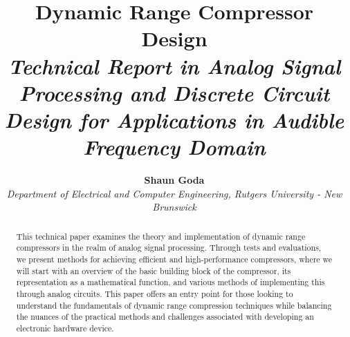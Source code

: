 \documentclass[10pt]{article}
\begin{document}
    \pagestyle{fancy}
    \fancyhf{}
    \renewcommand{\headrulewidth}{0pt}
    \fancypagestyle{firstpage}{
        \fancyhf{}
        \fancyfoot[C]{\footnotesize Page \thepage\ of \pageref{LastPage}}
        \renewcommand{\headrulewidth}{0pt}
    }

    \title{
        \vspace{-5ex}
        \textbf{\huge Dynamic Range Compressor Design}\\
        \textit{Technical Report in Analog Signal Processing and Discrete Circuit Design for Applications in Audible Frequency Domain}
    }

    \author{
        \textbf{\Large Shaun Goda}\\
        \textit{\normalsize Department of Electrical and Computer Engineering, Rutgers University - New Brunswick}
    }

    \date{\vspace{-5ex}} %

    \maketitle

    \thispagestyle{firstpage}

    \begin{abstract}
        This technical paper examines the theory and implementation of dynamic range compressors in the realm of analog signal processing. Through tests and evaluations, we present methods for achieving efficient and high-performance compressors, where we will start with an overview of the basic building block of the compressor, its representation as a mathematical function, and various methods of implementing this through analog circuits. This paper offers an entry point for those looking to understand the fundamentals of dynamic range compression techniques while balancing the nuances of the practical methods and challenges associated with developing an electronic hardware device.
    \end{abstract}
    
\end{document}
